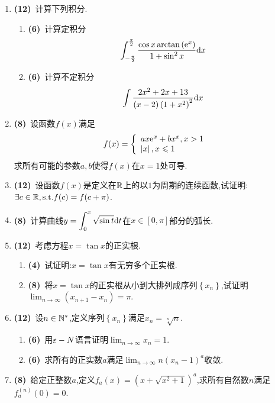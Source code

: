 \documentclass{ctexart}
\begin{document}
\begin{enumerate}[leftmargin=*,label=\textbf{\arabic*.},topsep=0pt,parsep=0pt,itemsep=0pt,partopsep=0pt]
    \item \textbf{(12)}\ 计算下列积分.
    \begin{enumerate}[label=\textbf{(\arabic*)}]
        \item \textbf{(6)}\ 计算定积分$$\int_{-\frac{\pi}{2}}^{\frac{\pi}{2}}\dfrac{\cos x\arctan\left(\mathrm{e}^x\right)}{1+\sin^2x}\mathrm{d} x$$
        \item \textbf{(6)}\ 计算不定积分$$\int\dfrac{2x^2+2x+13}{(x-2)\left(1+x^2\right)^2}\mathrm{d} x$$
    \end{enumerate}

    \item \textbf{(8)}\ 设函数$f(x)$满足$$f(x)=\left\{\begin{array}{l}ax\mathrm{e}^x+bx^x,x>1\\\left|x\right|,x\leqslant1\end{array}\right.$$
    求所有可能的参数$a,b$使得$f(x)$在$x=1$处可导.

    \item \textbf{(12)}\ 设函数$f(x)$是定义在$\mathbb{R}$上的以$1$为周期的连续函数,试证明:$\exists c\in\mathbb{R},\text{s.t.} f(c)=f(c+\pi)$.

    \item \textbf{(8)}\ 计算曲线$\displaystyle y=\int_0^x\sqrt{\sin t}\mathrm{d} t$在$x\in[0,\pi]$部分的弧长.

    \item \textbf{(12)}\ 考虑方程$x=\tan x$的正实根.
    \begin{enumerate}[label=\textbf{(\arabic*)}]
        \item \textbf{(4)}\ 试证明:$x=\tan x$有无穷多个正实根.
        \item \textbf{(8)}\ 将$x=\tan x$的正实根从小到大排列成序列$\left\{x_n\right\}$,试证明$\displaystyle\lim_{n\to\infty}\left(x_{n+1}-x_n\right)=\pi$.
    \end{enumerate}

    \item \textbf{(12)}\ 设$n\in\mathbb{N}^*$,定义序列$\left\{x_n\right\}$满足$x_n=\sqrt[n]{n}$.
    \begin{enumerate}[label=\textbf{(\arabic*)}]
        \item \textbf{(6)}\ 用$\varepsilon-N$语言证明$\displaystyle\lim_{n\to\infty}x_n=1$.
        \item \textbf{(6)}\ 求所有的正实数$a$满足$\displaystyle\lim_{n\to\infty}n(x_n-1)^a$收敛.
    \end{enumerate}

    \item \textbf{(8)}\ 给定正整数$a$,定义$f_a(x)=\left(x+\sqrt{x^2+1}\right)^a$,求所有自然数$n$满足$f_a^{(n)}(0)=0$.
\end{enumerate}
\end{document}
